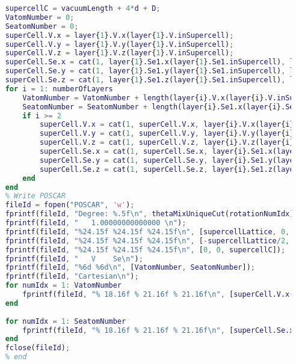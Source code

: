 \begin{lstlisting}[language=Matlab]
    % Calculate POSCAR
    supercellC = vacuumLength + 4*d + D;
    VatomNumber = 0;
    SeatomNumber = 0;
    superCell.V.x = layer{1}.V.x(layer{1}.V.inSupercell);
    superCell.V.y = layer{1}.V.y(layer{1}.V.inSupercell);
    superCell.V.z = layer{1}.V.z(layer{1}.V.inSupercell);
    superCell.Se.x = cat(1, layer{1}.Se1.x(layer{1}.Se1.inSupercell), layer{1}.Se2.x(layer{1}.Se2.inSupercell));
    superCell.Se.y = cat(1, layer{1}.Se1.y(layer{1}.Se1.inSupercell), layer{1}.Se2.y(layer{1}.Se2.inSupercell));
    superCell.Se.z = cat(1, layer{1}.Se1.z(layer{1}.Se1.inSupercell), layer{1}.Se2.z(layer{1}.Se2.inSupercell));
    for i = 1: numberOfLayers
        VatomNumber = VatomNumber + length(layer{i}.V.x(layer{i}.V.inSupercell));
        SeatomNumber = SeatomNumber + length(layer{i}.Se1.x(layer{i}.Se1.inSupercell)) + length(layer{i}.Se2.x(layer{i}.Se2.inSupercell));
        if i >= 2
            superCell.V.x = cat(1, superCell.V.x, layer{i}.V.x(layer{i}.V.inSupercell));
            superCell.V.y = cat(1, superCell.V.y, layer{i}.V.y(layer{i}.V.inSupercell));
            superCell.V.z = cat(1, superCell.V.z, layer{i}.V.z(layer{i}.V.inSupercell));
            superCell.Se.x = cat(1, superCell.Se.x, layer{i}.Se1.x(layer{i}.Se1.inSupercell), layer{i}.Se2.x(layer{i}.Se2.inSupercell));
            superCell.Se.y = cat(1, superCell.Se.y, layer{i}.Se1.y(layer{i}.Se1.inSupercell), layer{i}.Se2.y(layer{i}.Se2.inSupercell));
            superCell.Se.z = cat(1, superCell.Se.z, layer{i}.Se1.z(layer{i}.Se1.inSupercell), layer{i}.Se2.z(layer{i}.Se2.inSupercell));
        end
    end
    % Write POSCAR
    fileId = fopen("POSCAR", 'w');
    fprintf(fileId, "Degree: %.5f\n", thetaMixUniqueCut(rotationNumIdx));
    fprintf(fileId, "   1.00000000000000 \n");
    fprintf(fileId, "%24.15f %24.15f %24.15f\n", [supercellLattice, 0, 0]);
    fprintf(fileId, "%24.15f %24.15f %24.15f\n", [-supercellLattice/2, sqrt(3)/2*supercellLattice, 0]);
    fprintf(fileId, "%24.15f %24.15f %24.15f\n", [0, 0, supercellC]);
    fprintf(fileId, "   V    Se\n");
    fprintf(fileId, "%6d %6d\n", [VatomNumber, SeatomNumber]);
    fprintf(fileId, "Cartesian\n");
    for numIdx = 1: VatomNumber
        fprintf(fileId, "% 18.16f % 21.16f % 21.16f\n", [superCell.V.x(numIdx), superCell.V.y(numIdx), superCell.V.z(numIdx)]);
    end
    
    for numIdx = 1: SeatomNumber
        fprintf(fileId, "% 18.16f % 21.16f % 21.16f\n", [superCell.Se.x(numIdx), superCell.Se.y(numIdx), superCell.Se.z(numIdx)]);
    end
    fclose(fileId);
    % end    
\end{lstlisting}

